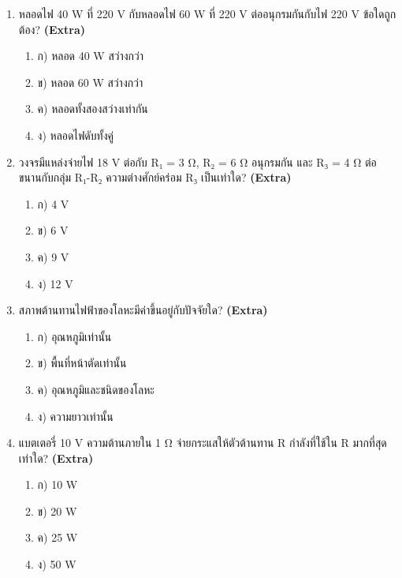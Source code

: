 \documentclass[12pt]{article}
\begin{document}
\begin{enumerate}[label=\arabic*.]
\begin{enumerate}[label=)]
\item ข) R
\item ค) 3R
\item ง) R/9
\end{enumerate}
\item หลอดไฟ 40 W ที่ 220 V กับหลอดไฟ 60 W ที่ 220 V ต่ออนุกรมกันกับไฟ 220 V ข้อใดถูกต้อง? \hfill \textbf{\small (Extra)}
\begin{enumerate}[label=)]
\item ก) หลอด 40 W สว่างกว่า
\item ข) หลอด 60 W สว่างกว่า
\item ค) หลอดทั้งสองสว่างเท่ากัน
\item ง) หลอดไฟดับทั้งคู่
\end{enumerate}
\item วงจรมีแหล่งจ่ายไฟ 18 V ต่อกับ R₁ = 3 Ω, R₂ = 6 Ω อนุกรมกัน และ R₃ = 4 Ω ต่อขนานกับกลุ่ม R₁-R₂ ความต่างศักย์คร่อม R₃ เป็นเท่าใด? \hfill \textbf{\small (Extra)}
\begin{enumerate}[label=)]
\item ก) 4 V
\item ข) 6 V
\item ค) 9 V
\item ง) 12 V
\end{enumerate}
\item สภาพต้านทานไฟฟ้าของโลหะมีค่าขึ้นอยู่กับปัจจัยใด? \hfill \textbf{\small (Extra)}
\begin{enumerate}[label=)]
\item ก) อุณหภูมิเท่านั้น
\item ข) พื้นที่หน้าตัดเท่านั้น
\item ค) อุณหภูมิและชนิดของโลหะ
\item ง) ความยาวเท่านั้น
\end{enumerate}
\item แบตเตอรี่ 10 V ความต้านภายใน 1 Ω จ่ายกระแสให้ตัวต้านทาน R กำลังที่ใช้ใน R มากที่สุดเท่าใด? \hfill \textbf{\small (Extra)}
\begin{enumerate}[label=)]
\item ก) 10 W
\item ข) 20 W
\item ค) 25 W
\item ง) 50 W
\end{enumerate}
\end{enumerate}
\end{document}
